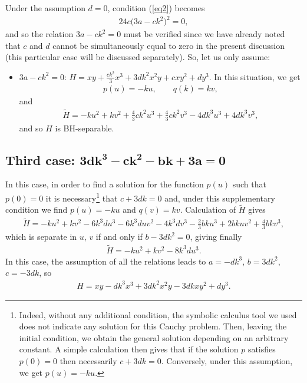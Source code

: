 \documentclass[10pt,a4paper]{amsart}
\numberwithin{equation}{section}
\begin{document}
Under the assumption $d=0$, condition (\ref{eq2}) becomes
\begin{gather*}%
24c\big(3a-ck^2\big)^2=0,
\end{gather*}
and so the relation $3a-ck^2=0$ must be verified since we have already noted that $c$ and $d$ cannot be simultaneously equal to zero in the present discussion (this particular case will be discussed separately). So, let us only assume:
\begin{itemize}\itemsep=0pt
\item $3a-ck^2=0$: $H=xy+\frac{ck^2}{3}x^3+3dk^2x^2y+cxy^2+dy^3$.
In this situation, we get
\begin{gather*}
p(u)=-ku,\qquad q(k)=kv,
\end{gather*}
and
\begin{gather*}
\widetilde{H}=-ku^2+kv^2+\frac{4}{3}ck^2u^3+\frac{4}{3}ck^2v^3-4dk^3u^3+4dk^3v^3,
\end{gather*}
and so $H$ is BH-separable.
\end{itemize}

\subsection*{Third case: $\boldsymbol{3dk^3-ck^2-bk+3a=0}$}

In this case, in order to find a solution for the function $p(u)$ such that $p(0)=0$ it is necessary\footnote{Indeed, without any additional condition, the symbolic calculus tool we used does not indicate any solution for this Cauchy problem. Then, leaving the initial condition, we obtain the general solution depending on an arbitrary constant. A simple calculation then gives that if the solution $p$ satisfies $p(0)=0$ then necessarily $c+3dk=0$. Conversely, under this assumption, we get $p(u)=-ku$.} that $c+3dk=0$ and, under this supplementary condition we find $p(u)=-ku$ and $q(v)=kv$. Calculation of $\widetilde{H}$ gives
\begin{gather*}
\widetilde{H}=-ku^2+kv^2-6k^3du^3-6k^3duv^2-4k^3dv^3-\frac{2}{3}bku^3+2bkuv^2+\frac{4}{3}bkv^3,
\end{gather*}
which is separate in $u$, $v$ if and only if $b-3dk^2=0$, giving finally
\begin{gather*}
\widetilde{H}=-ku^2+kv^2-8k^3du^3.
\end{gather*}
In this case, the assumption of all the relations leads to
$a=-dk^3$, $b=3dk^2$, $c=-3dk$, so
\begin{gather*}
H=xy-dk^3x^3+3dk^2x^2y-3dkxy^2+dy^3.
\end{gather*}
\end{document}
